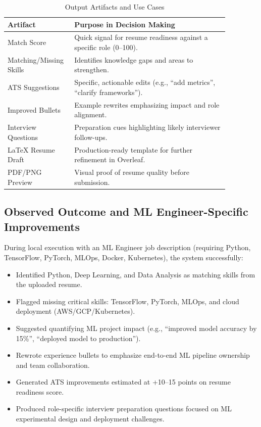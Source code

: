 \documentclass[conference]{IEEEtran}
\begin{document}
\begin{table}[htbp]
\caption{Output Artifacts and Use Cases}
\label{tab:outputs}
\centering
\footnotesize
\begin{tabular}{p{0.22\linewidth} p{0.65\linewidth}}
\toprule
\textbf{Artifact} & \textbf{Purpose in Decision Making} \\
\midrule
Match Score & Quick signal for resume readiness against a specific role (0--100). \\
Matching/Missing Skills & Identifies knowledge gaps and areas to strengthen. \\
ATS Suggestions & Specific, actionable edits (e.g., ``add metrics'', ``clarify frameworks''). \\
Improved Bullets & Example rewrites emphasizing impact and role alignment. \\
Interview Questions & Preparation cues highlighting likely interviewer follow-ups. \\
LaTeX Resume Draft & Production-ready template for further refinement in Overleaf. \\
PDF/PNG Preview & Visual proof of resume quality before submission. \\
\bottomrule
\end{tabular}
\end{table}

\subsection{Observed Outcome and ML Engineer-Specific Improvements}
During local execution with an ML Engineer job description (requiring Python, TensorFlow, PyTorch, MLOps, Docker, Kubernetes), the system successfully:
\begin{itemize}
    \item Identified Python, Deep Learning, and Data Analysis as matching skills from the uploaded resume.
    \item Flagged missing critical skills: TensorFlow, PyTorch, MLOps, and cloud deployment (AWS/GCP/Kubernetes).
    \item Suggested quantifying ML project impact (e.g., ``improved model accuracy by 15\%'', ``deployed model to production'').
    \item Rewrote experience bullets to emphasize end-to-end ML pipeline ownership and team collaboration.
    \item Generated ATS improvements estimated at +10--15 points on resume readiness score.
    \item Produced role-specific interview preparation questions focused on ML experimental design and deployment challenges.
\end{itemize}
\end{document}
